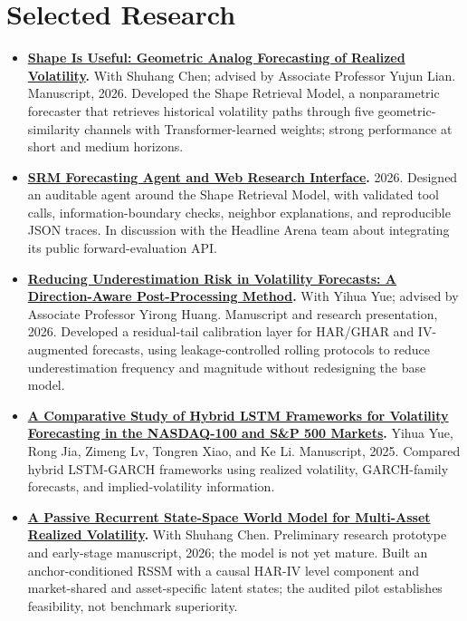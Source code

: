 \documentclass[10pt,a4paper]{article}
\begin{document}
\section*{Selected Research}
\begin{itemize}
  \item \textbf{\href{https://xtr1976536.github.io/files/papers/finance/Shape_Is_Useful_Geometric_Analog_Forecasting.pdf}{Shape Is Useful: Geometric Analog Forecasting of Realized Volatility}.} With Shuhang Chen; advised by Associate Professor Yujun Lian. Manuscript, 2026. Developed the Shape Retrieval Model, a nonparametric forecaster that retrieves historical volatility paths through five geometric-similarity channels with Transformer-learned weights; strong performance at short and medium horizons.

  \item \textbf{\href{https://github.com/xtr1976536/srm-forecasting-agent}{SRM Forecasting Agent and Web Research Interface}.} 2026. Designed an auditable agent around the Shape Retrieval Model, with validated tool calls, information-boundary checks, neighbor explanations, and reproducible JSON traces. In discussion with the Headline Arena team about integrating its public forward-evaluation API.

  \item \textbf{\href{https://xtr1976536.github.io/files/reports/talks/Conservative_Residual_Overlay_Slides.pdf}{Reducing Underestimation Risk in Volatility Forecasts: A Direction-Aware Post-Processing Method}.} With Yihua Yue; advised by Associate Professor Yirong Huang. Manuscript and research presentation, 2026. Developed a residual-tail calibration layer for HAR/GHAR and IV-augmented forecasts, using leakage-controlled rolling protocols to reduce underestimation frequency and magnitude without redesigning the base model.

  \item \textbf{\href{https://xtr1976536.github.io/files/papers/finance/Comparative_Study_Hybrid_LSTM_Volatility_Forecasting.pdf}{A Comparative Study of Hybrid LSTM Frameworks for Volatility Forecasting in the NASDAQ-100 and S\&P 500 Markets}.} Yihua Yue, Rong Jia, Zimeng Lv, Tongren Xiao, and Ke Li. Manuscript, 2025. Compared hybrid LSTM-GARCH frameworks using realized volatility, GARCH-family forecasts, and implied-volatility information.

  \item \textbf{\href{https://github.com/xtr1976536/volatility-world-model}{A Passive Recurrent State-Space World Model for Multi-Asset Realized Volatility}.} With Shuhang Chen. Preliminary research prototype and early-stage manuscript, 2026; the model is not yet mature. Built an anchor-conditioned RSSM with a causal HAR-IV level component and market-shared and asset-specific latent states; the audited pilot establishes feasibility, not benchmark superiority.


\end{itemize}
\end{document}
